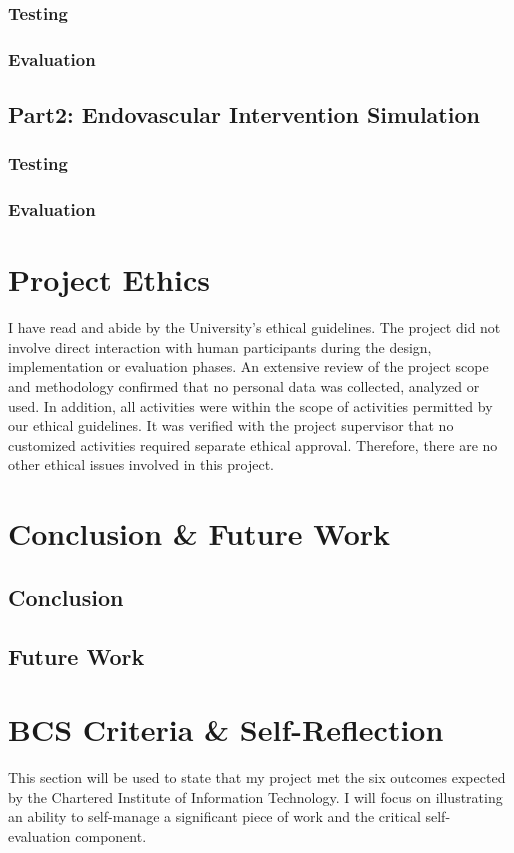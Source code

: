 \documentclass[12pt]{article}
\begin{document}
\subsubsection{Testing}
\subsubsection{Evaluation}
\subsection{Part2: Endovascular Intervention Simulation}
\subsubsection{Testing}
\subsubsection{Evaluation}

\section{Project Ethics}
I have read and abide by the University’s ethical guidelines\cite{UoL_COMP390_2023-24}. The project did not involve direct interaction with human
participants during the design, implementation or evaluation phases. An extensive review of the project scope and methodology
confirmed that no personal data was collected, analyzed or used. In addition, all activities were within the scope of activities
permitted by our ethical guidelines. It was verified with the project supervisor that no customized activities required separate
ethical approval. Therefore, there are no other ethical issues involved in this project.
\section{Conclusion \& Future Work}
\subsection{Conclusion}

\subsection{Future Work}

\section{BCS Criteria \& Self-Reflection}
This section will be used to state that my project met the six outcomes expected by the Chartered Institute of Information Technology\cite{BCS2020}.
I will focus on illustrating an ability to self-manage a significant piece of work and the critical self-evaluation component.
\end{document}
